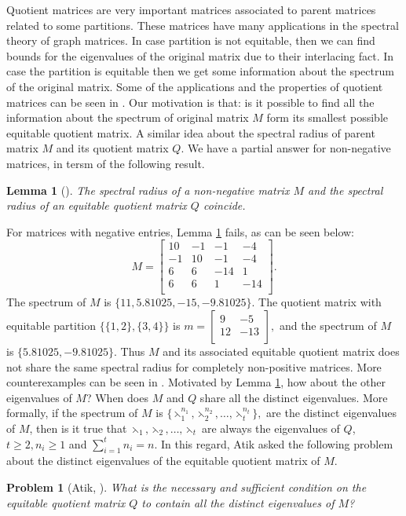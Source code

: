 \documentclass[12pt,twoside]{article}
\newtheorem{problem}{Problem}
\newtheorem{lemma}[theorem]{Lemma}
\begin{document}
Quotient matrices are very important matrices associated to parent matrices related to some partitions. These matrices have many applications in the spectral theory of graph matrices. In case partition is not equitable, then we can find bounds for the eigenvalues of the original matrix due to their interlacing fact. In case the partition is equitable then we get some information about the spectrum of the original matrix. Some of the applications and the properties of quotient matrices can be seen in \cite{DS, mehreen1, atikELA2018, you,bilal2020, bilal}. Our motivation is that: is it possible to find all the information about the spectrum of original matrix $ M$ form its smallest possible equitable quotient matrix.  A similar idea about the spectral radius of parent matrix $M$ and its quotient matrix $Q.$ We have a partial answer for non-negative matrices, in tersm of the following result.
\begin{lemma}[\cite{atikELA2018, you}]\label{spectral radius of positive matrices}
	The spectral radius of a non-negative matrix $ M $ and the spectral radius of an equitable quotient matrix $ Q $ coincide.
\end{lemma}
For matrices with negative entries, Lemma \ref{spectral radius of positive matrices} fails, as can be seen below:
 $$M=\left[
\begin{array}{cccc}
	10 & -1 & -1 & -4 \\
	-1 & 10 & -1 & -4 \\
	6 & 6 & -14 & 1 \\
	6 & 6 & 1 & -14 \\
\end{array}
\right].
$$
The spectrum of $M$ is $ \{11,5.81025, -15, -9.81025\}$. The quotient matrix with equitable partition  $\{\{1,2\},\{3,4\}\} $ is	$ 	m=\left[
\begin{array}{cc}
	9 & -5 \\
	12 & -13 \\
\end{array}
\right],
$  and the spectrum of $M$ is $	\{5.81025, -9.81025\}$. Thus $M$ and its associated equitable quotient matrix does not share the same spectral radius for completely non-positive matrices. More counterexamples can be seen in \cite{atikELA2018, you, bilalijpam}. Motivated by Lemma \ref{spectral radius of positive matrices}, how about the other eigenvalues of $M$? When does $M$ and $Q$ share all the distinct eigenvalues. 
More formally, if the spectrum of $M$ is $ \{\leftthreetimes_{1}^{n_{1}},\leftthreetimes_{2}^{n_{2}},\dots, \leftthreetimes_{t}^{n_{t}}\},$ are the distinct eigenvalues of $ M $, then is it true that $ \leftthreetimes_{1},\leftthreetimes_{2},\dots, \leftthreetimes_{t} $ are always the eigenvalues of $ Q $, $ t\geq 2, n_{i}\geq 1 $ and $\sum_{i=1}^{t}n_{i}=n$. In this regard, Atik \cite{atik} asked the following problem about the distinct eigenvalues of the equitable quotient matrix of  $ M $.
\begin{problem}[Atik, \cite{atik}]\label{distinct eigenvalue problem}
	What is the necessary and sufficient condition on the equitable quotient matrix $ Q $ to contain all the distinct eigenvalues of $ M $?
\end{problem}
\end{document}

